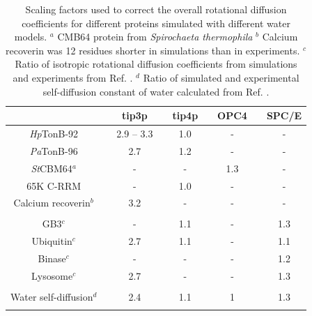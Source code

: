 \documentclass[journal=jpcbfk]{achemso}
\begin{document}
\begin{table}[!h]
  \centering
  \caption{Scaling factors used to correct the overall rotational diffusion coefficients for different proteins
    simulated with different water models.
    $^{a}$ CMB64 protein from {\it Spirochaeta thermophila}
    $^{b}$ Calcium recoverin was 12 residues shorter in simulations than in experiments.
    $^{c}$ Ratio of isotropic rotational diffusion coefficients from simulations and experiments from Ref. .
    $^{d}$ Ratio of simulated and experimental self-diffusion constant of water calculated from Ref. .  }\label{ROTdiffCOEFFSscaled}
  \begin{tabular}{c c c c c c c c c}
                                       &    & tip3p &  & tip4p && OPC4 && SPC/E \\
    \hline
    {\it Hp}TonB-92                    &    & 2.9 -- 3.3   &  & 1.0     && -  && - \\
    {\it Pa}TonB-96                    &    &  2.7    &  & 1.2   && -    && -\\
    {\it St}CBM64$^{a}$ \cite{heikkinen18}          &    &  -    &  & -     && 1.3  && -\\
    65K C-RRM \cite{norppa18}          &    & -     &  & 1.0     && -  && -\\
    Calcium recoverin$^{b}$ \cite{timr18}    &    &  3.2  &  & -     && -    && -\\
    &&&&&& \\
    GB3$^{c}$                           &    & -     &  & 1.1    && -   && 1.3 \\
    Ubiquitin$^{c}$                     &    & 2.7   &  & 1.1    && -   && 1.1 \\
    Binase$^{c}$                        &    & -     &  & -   && -   && 1.2 \\
    Lysosome$^{c}$                      &    & 2.7   &  & -    && -   && 1.3 \\
    &&&&&& \\
    Water self-diffusion$^{d}$  &    & 2.4   & & 1.1   &&  1 && 1.3 \\
    &&&&&& \\
  \end{tabular}
  \newline
  \flushleft
\end{table}

\pagebreak


\end{document}
